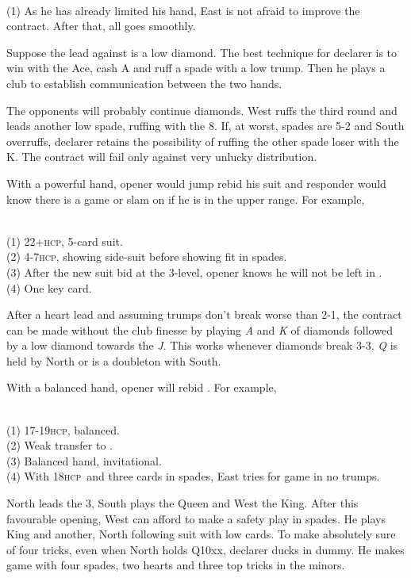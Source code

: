 \documentclass[a4paper,article,oneside]{memoir}
\newcommand{\gap}{\vspace{\baselineskip}}
\newcommand{\hcp}{\textsc{hcp}}
\begin{document}
 \\ (1) As he has already
limited his hand, East is not afraid to improve the contract. After
that, all goes smoothly.

Suppose the lead against  is a low diamond. The best technique
for declarer is to win with the Ace, cash \sp{}A and ruff a spade with
a low trump. Then he plays a club to establish communication between
the two hands.

The opponents will probably continue diamonds. West ruffs the third
round and leads another low spade, ruffing with the \he{}8. If, at
worst, spades are 5-2 and South overruffs, declarer retains the
possibility of ruffing the other spade loser with the \he{}K. The
contract will fail only against very unlucky distribution.

\gap
With a powerful hand, opener would jump rebid his suit and responder
would know there is a game or slam on if he is in the upper range. For
example,

 \\
(1) 22+\hcp, 5-card suit. \\ (2) 4-7\hcp, showing side-suit before
showing fit in spades. \\ (3) After the new suit bid at the 3-level,
opener knows he will not be left in . \\ (4) One key card.

After a heart lead and assuming trumps don't break worse than 2-1, the
contract can be made without the club finesse by playing \emph{A} and
\emph{K} of diamonds followed by a low diamond towards the
\emph{J}. This works whenever diamonds break 3-3, \di{}\emph{Q} is
held by North or is a doubleton with South.

\gap
With a balanced hand, opener will rebid \nt{}. For example,

 \\
(1) 17-19\hcp, balanced. \\ (2) Weak transfer to . \\ (3)
Balanced hand, invitational. \\ (4) With 18\hcp\ and three cards in
spades, East tries for game in no trumps.

North leads the \he{}3, South plays the Queen and West the King. After
this favourable opening, West can afford to make a safety play in
spades. He plays King and another, North following suit with low
cards. To make absolutely sure of four tricks, even when North holds
Q10xx, declarer ducks in dummy. He makes game with four spades, two
hearts and three top tricks in the minors.
\end{document}
